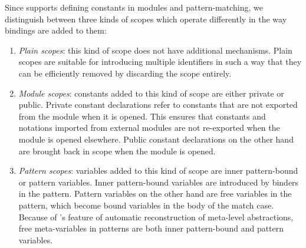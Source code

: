 
Since \Beluga supports defining constants in modules and pattern-matching, we distinguish between three kinds of scopes which operate differently in the way bindings are added to them:
\begin{enumerate}
\item
\textit{Plain scopes}: this kind of scope does not have additional mechanisms.
Plain scopes are suitable for introducing multiple identifiers in such a way that they can be efficiently removed by discarding the scope entirely.
\item
\textit{Module scopes}: constants added to this kind of scope are either private or public.
Private constant declarations refer to constants that are not exported from the module when it is opened.
This ensures that constants and notations imported from external modules are not re-exported when the module is opened elsewhere.
Public constant declarations on the other hand are brought back in scope when the module is opened.
\item
\textit{Pattern scopes}: variables added to this kind of scope are inner pattern-bound or pattern variables.
Inner pattern-bound variables are introduced by binders in the pattern.
Pattern variables on the other hand are free variables in the pattern, which become bound variables in the body of the match case.
Because of \Beluga's feature of automatic reconstruction of meta-level abstractions, free meta-variables in patterns are both inner pattern-bound and pattern variables.
\end{enumerate}






\newcommand{\private}[1]{#1_\downarrow}
\newcommand{\public}[1]{#1_\uparrow}
\newcommand{\Private}[1]{#1_\Downarrow}
\newcommand{\Public}[1]{#1_\Uparrow}
\newcommand{\Env}{\Xi}
\newcommand{\Scope}{\mathbb{S}}
\newcommand{\Module}{\mathbb{M}}
\newcommand{\Pattern}{\mathbb{P}}
\newcommand{\Entry}{\mathbb{E}}
\newcommand{\Var}{\mathbb{V}}
\newcommand{\Constant}{\mathbb{C}}


